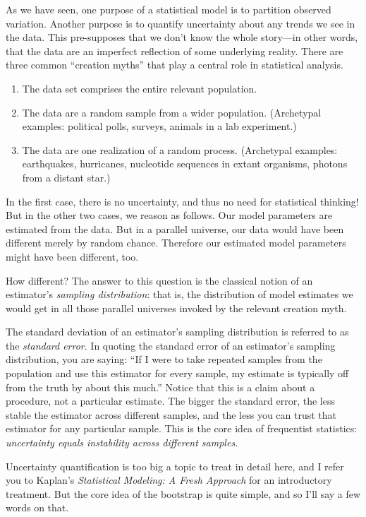 \documentclass[11pt]{article}
\newcommand{\1}[1]{\mathbf{1}_{\{ {#1} \}}}
\begin{document}
As we have seen, one purpose of a statistical model is to partition observed variation.  Another purpose is to quantify uncertainty about any trends we see in the data.  This pre-supposes that we don't know the whole story---in other words, that the data are an imperfect reflection of some underlying reality.  There are three common ``creation myths'' that play a central role in statistical analysis.
\begin{enumerate}
\item The data set comprises the entire relevant population.
\item The data are a random sample from a wider population.  (Archetypal examples: political polls, surveys, animals in a lab experiment.)
\item The data are one realization of a random process.  (Archetypal examples: earthquakes, hurricanes, nucleotide sequences in extant organisms, photons from a distant star.)
\end{enumerate}
In the first case, there is no uncertainty, and thus no need for statistical thinking!  But in the other two cases, we reason as follows.  Our model parameters are estimated from the data.  But in a parallel universe, our data would have been different merely by random chance.  Therefore our estimated model parameters might have been different, too.

How different?  The answer to this question is the classical notion of an estimator's \textit{sampling distribution}: that is, the distribution of model estimates we would get in all those parallel universes invoked by the relevant creation myth.

The standard deviation of an estimator's sampling distribution is referred to as the \textit{standard error}.  In quoting the standard error of an estimator's sampling distribution, you are saying: ``If I were to take repeated samples from the population and use this estimator for every sample, my estimate is typically off from the truth by about this much.''  Notice that this is  a claim about a procedure, not a particular estimate.  The bigger the standard error, the less stable the estimator across different samples, and the less you can trust that estimator for any particular sample.  This is the core idea of frequentist statistics: \textit{uncertainty equals instability across different samples.}

Uncertainty quantification is too big a topic to treat in detail here, and I refer you to Kaplan's \textit{Statistical Modeling: A Fresh Approach} for an introductory treatment.  But the core idea of the bootstrap is quite simple, and so I'll say a few words on that.
\end{document}
